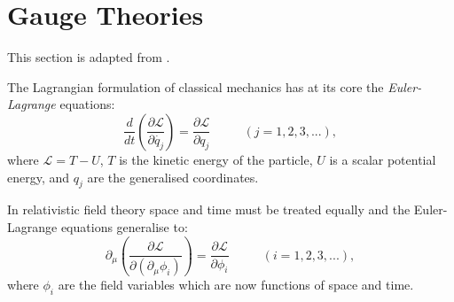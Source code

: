 \chapter{Gauge Theories}
\label{appendix1}
This section is adapted from \cite{griffiths}.

The Lagrangian formulation of classical mechanics has at its core the \emph{Euler-Lagrange} equations:
\begin{equation}
\frac{d}{dt} \left( \frac{\partial \mathcal{L}}{\partial \dot{q_{j}}} \right) = \frac{\partial \mathcal{L}}{\partial q_{j}} \ \ \ \ \ \ \ \ \ \ \ \ (j=1,2,3,...),
\end{equation}
where $ \mathcal{L} = T - U$, $T$ is the kinetic energy of the particle, $U$ is a scalar potential energy, and $q_{j}$ are the generalised coordinates.

In relativistic field theory space and time must be treated equally and the Euler-Lagrange equations generalise to:
\begin{equation}
\partial _{\mu} \left( \frac{\partial \mathcal{L}}{\partial \left( \partial_{\mu} \phi_{i} \right)} \right) = \frac{\partial \mathcal{L}}{\partial \phi_{i}} \ \ \ \ \ \ \ \ \ \ \ \ (i=1,2,3,...),
\end{equation}
where $\phi _{i}$ are the field variables which are now functions of space and time.


